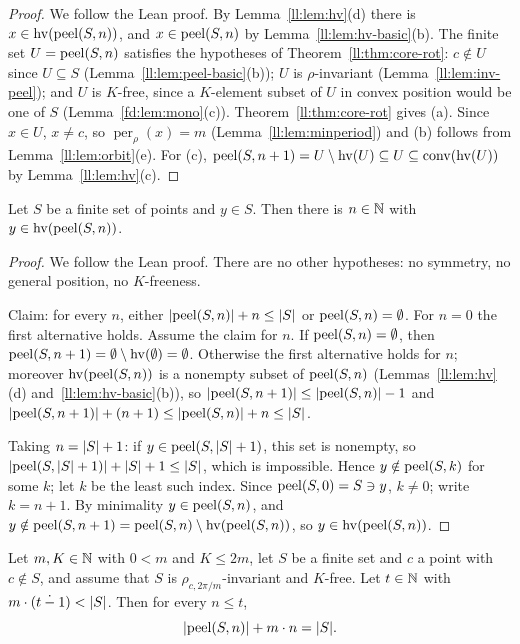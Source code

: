 \begin{proof}
We follow the Lean proof. By Lemma~\ref{ll:lem:hv}(d) there is $x\in\operatorname{hv}(\operatorname{peel}(S,n))$, and $x\in\operatorname{peel}(S,n)$ by
Lemma~\ref{ll:lem:hv-basic}(b). The finite set $U=\operatorname{peel}(S,n)$ satisfies the hypotheses of
Theorem~\ref{ll:thm:core-rot}: $c\notin U$ since $U\subseteq S$ (Lemma~\ref{ll:lem:peel-basic}(b)); $U$ is
$\rho$-invariant (Lemma~\ref{ll:lem:inv-peel}); and $U$ is $K$-free, since a $K$-element subset of $U$ in convex position
would be one of $S$ (Lemma~\ref{fd:lem:mono}(c)). Theorem~\ref{ll:thm:core-rot} gives (a). Since $x\in U$, $x\ne c$, so
$\operatorname{per}_\rho(x)=m$ (Lemma~\ref{ll:lem:minperiod}) and (b) follows from Lemma~\ref{ll:lem:orbit}(e). For (c),
$\operatorname{peel}(S,n+1)=U\setminus\operatorname{hv}(U)\subseteq U\subseteq\operatorname{conv}(\operatorname{hv}(U))$ by Lemma~\ref{ll:lem:hv}(c).
\end{proof}

\begin{lemma}
\label{ll:lem:exists-layer}
Let $S$ be a finite set of points and $y\in S$. Then there is $n\in\mathbb N$ with $y\in\operatorname{hv}(\operatorname{peel}(S,n))$.
\end{lemma}

\begin{proof}
We follow the Lean proof. There are no other hypotheses: no symmetry, no general position, no $K$-freeness.

Claim: for every $n$, either $\lvert\operatorname{peel}(S,n)\rvert+n\le\lvert S\rvert$ or $\operatorname{peel}(S,n)=\emptyset$. For $n=0$ the first alternative
holds. Assume the claim for $n$. If $\operatorname{peel}(S,n)=\emptyset$, then $\operatorname{peel}(S,n+1)=\emptyset\setminus\operatorname{hv}(\emptyset)
=\emptyset$. Otherwise the first alternative holds for $n$; moreover $\operatorname{hv}(\operatorname{peel}(S,n))$ is a nonempty subset of
$\operatorname{peel}(S,n)$ (Lemmas~\ref{ll:lem:hv}(d) and~\ref{ll:lem:hv-basic}(b)), so
$\lvert\operatorname{peel}(S,n+1)\rvert\le\lvert\operatorname{peel}(S,n)\rvert-1$ and $\lvert\operatorname{peel}(S,n+1)\rvert+(n+1)\le\lvert\operatorname{peel}(S,n)\rvert+n\le\lvert S\rvert$.

Taking $n=\lvert S\rvert+1$: if $y\in\operatorname{peel}(S,\lvert S\rvert+1)$, this set is nonempty, so
$\lvert\operatorname{peel}(S,\lvert S\rvert+1)\rvert+\lvert S\rvert+1\le\lvert S\rvert$, which is impossible. Hence $y\notin\operatorname{peel}(S,k)$ for some $k$; let $k$ be
the least such index. Since $\operatorname{peel}(S,0)=S\ni y$, $k\ne0$; write $k=n+1$. By minimality $y\in\operatorname{peel}(S,n)$, and
$y\notin\operatorname{peel}(S,n+1)=\operatorname{peel}(S,n)\setminus\operatorname{hv}(\operatorname{peel}(S,n))$, so $y\in\operatorname{hv}(\operatorname{peel}(S,n))$.
\end{proof}

\begin{theorem}\label{ll:thm:card-peel}
Let $m,K\in\mathbb N$ with $0<m$ and $K\le2m$, let $S$ be a finite set and $c$ a point with $c\notin S$, and assume that $S$ is
$\rho_{c,2\pi/m}$-invariant and $K$-free. Let $t\in\mathbb N$ with $m\cdot(t\mathbin{\dot{-}}1)<\lvert S\rvert$. Then for every
$n\le t$,
\[\lvert\operatorname{peel}(S,n)\rvert+m\cdot n=\lvert S\rvert .\]
\end{theorem}

